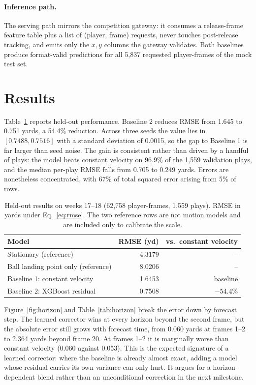\documentclass{article}
\begin{document}
\paragraph{Inference path.}
The serving path mirrors the competition gateway: it consumes a release-frame feature
table plus a list of (player, frame) requests, never touches post-release tracking,
and emits only the $x,y$ columns the gateway validates. Both baselines produce
format-valid predictions for all 5{,}837 requested player-frames of the mock test set.

\section{Results}
\label{sec:results}

Table~\ref{tab:headline} reports held-out performance. Baseline 2 reduces RMSE from
1.645 to 0.751 yards, a 54.4\% reduction. Across three seeds the value lies in
$[0.7488,0.7516]$ with a standard deviation of 0.0015, so the gap to Baseline 1 is
far larger than seed noise. The gain is consistent rather than driven by a handful of
plays: the model beats constant velocity on 96.9\% of the 1{,}559 validation plays,
and the median per-play RMSE falls from 0.705 to 0.249 yards. Errors are nonetheless
concentrated, with 67\% of total squared error arising from 5\% of rows.

\begin{table}[t]
\centering
\caption{Held-out results on weeks 17--18 (62{,}758 player-frames, 1{,}559 plays).
RMSE in yards under Eq.~\eqref{eq:rmse}. The two reference rows are not motion
models and are included only to calibrate the scale.}
\label{tab:headline}
\begin{tabular}{@{}lrr@{}}
\toprule
Model & RMSE (yd) & vs.\ constant velocity \\
\midrule
Stationary (reference)            & 4.3179 & -- \\
Ball landing point only (reference) & 8.0206 & -- \\
Baseline 1: constant velocity      & 1.6453 & baseline \\
Baseline 2: XGBoost residual       & 0.7508 & $-54.4\%$ \\
\bottomrule
\end{tabular}
\end{table}

Figure~\ref{fig:horizon} and Table~\ref{tab:horizon} break the error down by forecast
step. The learned corrector wins at every horizon beyond the second frame, but the
absolute error still grows with forecast time, from 0.060 yards at frames 1--2 to
2.364 yards beyond frame 20. At frames 1--2 it is marginally worse than constant
velocity (0.060 against 0.053). This is the expected signature of a learned
corrector: where the baseline is already almost exact, adding a model whose residual
carries its own variance can only hurt. It argues for a horizon-dependent blend
rather than an unconditional correction in the next milestone.
\end{document}
